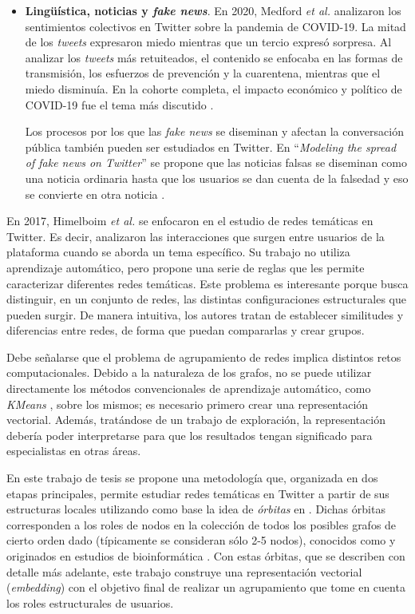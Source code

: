 \begin{itemize}
    \item \textbf{Lingüística, noticias y \textit{fake news}}. En 2020, Medford \textit{et al.} analizaron los sentimientos colectivos en Twitter sobre la pandemia de COVID-19. La mitad de los \textit{tweets} expresaron miedo mientras que un tercio expresó sorpresa. Al analizar los \textit{tweets} más retuiteados, el contenido se enfocaba en las formas de transmisión, los esfuerzos de prevención y la cuarentena, mientras que el miedo disminuía. En la cohorte completa, el impacto económico y político de COVID-19 fue el tema más discutido \cite{medford_infodemic_2020}. 

    Los procesos por los que las \textit{fake news} se diseminan y afectan la conversación pública también pueden ser estudiados en Twitter. En \enquote{\textit{Modeling the spread of fake news on Twitter}} se propone que las noticias falsas se diseminan como una noticia ordinaria hasta que los usuarios se dan cuenta de la falsedad y eso se convierte en otra noticia \cite{murayama_modeling_2021}.

\end{itemize}

En 2017, Himelboim \textit{et al.} \cite{himelboim_classifying_2017} se enfocaron en el estudio de redes temáticas en Twitter. Es decir, analizaron las interacciones que surgen entre usuarios de la plataforma cuando se aborda un tema específico. Su trabajo no utiliza aprendizaje automático, pero propone una serie de reglas que les permite caracterizar diferentes redes temáticas. Este problema es interesante porque busca distinguir, en un conjunto de redes, las distintas configuraciones estructurales que pueden surgir. De manera intuitiva, los autores tratan de establecer similitudes y diferencias entre redes, de forma que puedan compararlas y crear grupos. 

Debe señalarse que el problema de agrupamiento de redes implica distintos retos computacionales. Debido a la naturaleza de los grafos, no se puede utilizar directamente los métodos convencionales de aprendizaje automático, como \textit{KMeans} \cite{bejar_k-means_nodate}, sobre los mismos; es necesario primero crear una representación vectorial. Además, tratándose de un trabajo de exploración, la representación debería poder interpretarse para que los resultados tengan significado para especialistas en otras áreas. 

En este trabajo de tesis se propone una metodología que, organizada en dos etapas principales, permite estudiar redes temáticas en Twitter a partir de sus estructuras locales utilizando como base la idea de \textit{órbitas} \cite{sarajlic_graphlet-based_2016} en {\emph \graphlets}. Dichas órbitas corresponden a los roles de nodos en la colección de todos los posibles grafos de cierto orden dado (típicamente se consideran sólo 2-5 nodos), conocidos como \graphlets y originados en estudios de bioinformática \cite{przulj_biological_2007}. Con estas órbitas, que se describen con detalle más adelante, este trabajo construye una representación vectorial (\textit{embedding}) con el objetivo final de realizar un agrupamiento que tome en cuenta los roles estructurales de usuarios.

